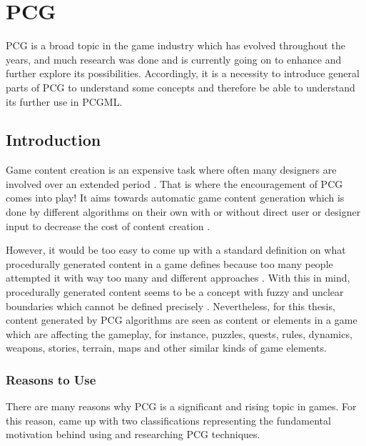 \documentclass[MGS,Master,english]{twbook}%
\begin{document}
%
%
\clearpage
\chapter{\acl{PCG}}
\ac{PCG} is a broad topic in the game industry which has evolved throughout the years, and much research was done and is currently going on to enhance and further explore its possibilities. Accordingly, it is a necessity to introduce general parts of \ac{PCG} to understand some concepts and therefore be able to understand its further use in \ac{PCGML}.

\section{Introduction}
Game content creation is an expensive task where often many designers are involved over an extended period \cite{pcg::PCGinGameIndustry}. That is where the encouragement of \ac{PCG} comes into play! It aims towards automatic game content generation which is done by different algorithms on their own with or without direct user or designer input to decrease the cost of content creation \cite{pcg::PCGinGameIndustry} \cite{pcg::whatIsPCG}.

However, it would be too easy to come up with a standard definition on what procedurally generated content in a game defines because too many people attempted it with way too many and different approaches \cite{pcg::whatIsPCG}. With this in mind, procedurally generated content seems to be a concept with fuzzy and unclear boundaries which cannot be defined precisely \cite{pcg::whatIsPCG}. Nevertheless, for this thesis, content generated by \ac{PCG} algorithms are seen as content or elements in a game which are affecting the gameplay, for instance, puzzles, quests, rules, dynamics, weapons, stories, terrain, maps and other similar kinds of game elements.

\subsection{Reasons to Use}
There are many reasons why \ac{PCG} is a significant and rising topic in games. For this reason, \citep{pcg::inGameDesign} came up with two classifications representing the fundamental motivation behind using and researching \ac{PCG} techniques.
\end{document}
